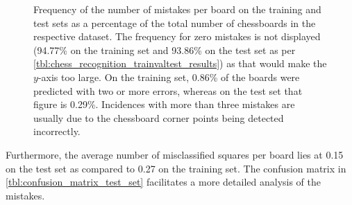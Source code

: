 \documentclass[../report.tex]{subfiles}
\begin{document}
\begin{figure}
{\begin{tikzpicture}
        \end{tikzpicture}
    }
    \caption[Frequency of the number of mistakes per board on the training and test sets.]{Frequency of the number of mistakes per board on the training and test sets as a percentage of the total number of chessboards in the respective dataset. The frequency for zero mistakes is not displayed (94.77\% on the training set and 93.86\% on the test set as per \cref{tbl:chess_recognition_trainvaltest_results}) as that would make the $y$-axis too large. On the training set, 0.86\% of the boards were predicted with two or more errors, whereas on the test set that figure is 0.29\%. Incidences with more than three mistakes are usually due to the chessboard corner points being detected incorrectly.}
    \label{fig:mistakes_frequency}
\end{figure}
Furthermore, the average number of misclassified squares per board lies at 0.15 on the test set as compared to 0.27 on the training set.
The confusion matrix in \cref{tbl:confusion_matrix_test_set} facilitates a more detailed analysis of the mistakes.
\end{document}
